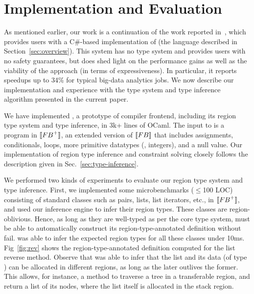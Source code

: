 \section{Implementation and Evaluation}
\label{sec:implementation}


As mentioned earlier, our work is a continuation of the work reported in~\cite{Broom:HotOS},
which provides users with a C\#-based implementation of \broom (the language described in
Section~\ref{sec:overview}). This system has no type system and provides users with no safety
guarantees, but does shed light on the performance gains as well as the viability of the
approach (in terms of expressiveness). In particular, it reports speedups up to 34\% for
typical big-data analytics jobs.
We now describe our implementation and experience with the type system and type inference
algorithm presented in the current paper.

We have implemented \namec, a prototype of \name compiler frontend,
including its region type system and type inference, in 3k+ lines of
OCaml.
The input to \namec is a program in $\llbracket {\sc FB}^+ \rrbracket$, an extended version of $\llbracket {\sc FB} \rrbracket$ that
includes assignments, conditionals, loops, more primitive datatypes
(\eg, integers), and a null value. 
Our implementation of region type inference and constraint solving
closely follows the description given in
Sec.~\ref{sec:type-inference}.


We performed two kinds of experiments to evaluate our region type system and type
inference.
First, we implemented some 
microbenchmarks ($\le$100 LOC) consisting of standard classes such
as pairs, lists, list iterators, etc., in $\llbracket {\sc FB}^+ \rrbracket$, and used
our inference engine to infer their region types.
These classes are region-oblivious. Hence, as long as they are well-typed
as per the core type system, \namec must be able to automatically construct its
region-type-annotated definition without fail. \namec was
able to infer the expected region types for all these classes under 10ms.
Fig~\ref{fig:rev} shows the region-type-annotated
definition computed for the list reverse method. Observe that \namec
was able to infer that the list and its data (of type ) can be
allocated in different regions, as long as the later outlives the
former. This allows, for instance, a  method to traverse a
tree in a transferable region, and return a list of its nodes, where
the list itself is allocated in the stack region. 

